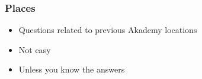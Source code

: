 \begin{frame}
 \frametitle{Places}

	\begin{itemize}
		\item Questions related to previous Akademy locations
		\item Not easy
		\item Unless you know the answers
	\end{itemize}
\end{frame}

